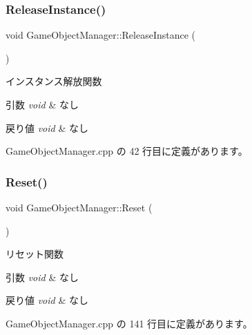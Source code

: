 \subsubsection{\texorpdfstring{Release\+Instance()}{ReleaseInstance()}}
{\footnotesize\ttfamily void Game\+Object\+Manager\+::\+Release\+Instance (\begin{DoxyParamCaption}{ }\end{DoxyParamCaption})\hspace{0.3cm}{\ttfamily [static]}}



インスタンス解放関数 


\begin{DoxyParams}{引数}
{\em void} & なし \\
\hline
\end{DoxyParams}

\begin{DoxyRetVals}{戻り値}
{\em void} & なし \\
\hline
\end{DoxyRetVals}


 Game\+Object\+Manager.\+cpp の 42 行目に定義があります。

\mbox{\label{class_game_object_manager_a77f770050f7d8022bfeceda098846ae8}} 
\subsubsection{\texorpdfstring{Reset()}{Reset()}}
{\footnotesize\ttfamily void Game\+Object\+Manager\+::\+Reset (\begin{DoxyParamCaption}{ }\end{DoxyParamCaption})}



リセット関数 


\begin{DoxyParams}{引数}
{\em void} & なし \\
\hline
\end{DoxyParams}

\begin{DoxyRetVals}{戻り値}
{\em void} & なし \\
\hline
\end{DoxyRetVals}


 Game\+Object\+Manager.\+cpp の 141 行目に定義があります。

